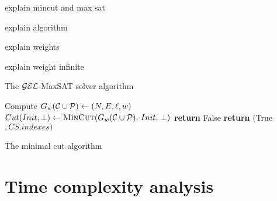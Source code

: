 explain mincut and max sat

explain algorithm

explain weights

explain weight infinite

\begin{algorithm}
	\caption{The $\mathcal{GEL}$-MaxSAT solver algorithm}
	\label{alg:max-sat}
	\begin{algorithmic}[1]
		\State Compute $G_w(\mathcal{C} \cup \mathcal{P}) \gets (N, E, \ell, w)$
		\State $Cut(Init, \bot) \gets \Call{MinCut}{G_w(\CC \cup \PP),\, Init,\, \bot}$
		\State \textbf{return} False
		\EndIf
		\Statex
		\State \textbf{return} $($True$, CS.indexes)$
		\EndFunction
	\end{algorithmic}
\end{algorithm}


\begin{algorithm}
	\caption{The minimal cut algorithm}
	\label{alg:max-sat}
	\begin{algorithmic}[1]
		\EndFunction
	\end{algorithmic}
\end{algorithm}

\section{Time complexity analysis}

